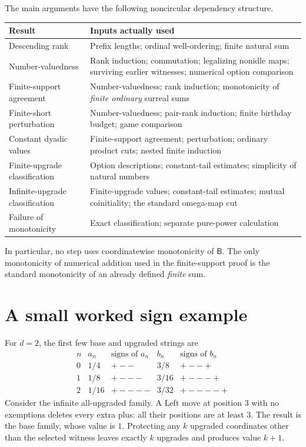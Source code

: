 \documentclass[11pt,letterpaper]{article}
\theoremstyle{definition}
\theoremstyle{remark}
\newcommand{\BB}{\mathsf B}
\begin{document}
The main arguments have the following noncircular dependency structure.
\begin{center}
\renewcommand{\arraystretch}{1.14}
\begin{tabular}{p{}p{}}
\toprule
Result & Inputs actually used\\
\midrule
Descending rank & Prefix lengths; ordinal well-ordering; finite natural sum\\
Number-valuedness & Rank induction; commutation; legalizing nonidle maps;
 surviving earlier witnesses; numerical option comparison\\
Finite-support agreement & Number-valuedness; rank induction; monotonicity of
 \emph{finite ordinary} surreal sums\\
Finite-short perturbation & Number-valuedness; pair-rank induction; finite
 birthday budget; game comparison\\
Constant dyadic values & Finite-support agreement; perturbation; ordinary
 product cuts; nested finite induction\\
Finite-upgrade classification & Option descriptions; constant-tail estimates;
 simplicity of natural numbers\\
Infinite-upgrade classification & Finite-upgrade values; constant-tail estimates;
 mutual coinitiality; the standard omega-map cut\\
Failure of monotonicity & Exact classification; separate pure-power calculation\\
\bottomrule
\end{tabular}
\end{center}
In particular, no step uses coordinatewise monotonicity of $\BB$. The only
monotonicity of numerical addition used in the finite-support proof is the
standard monotonicity of an already defined \emph{finite} sum.

\section{A small worked sign example}

For $d=2$, the first few base and upgraded strings are
\[
\begin{array}{c|c|c|c|c}
 n&a_n&\text{signs of }a_n&b_n&\text{signs of }b_n\\\hline
 0&1/4&\mathtt{+--}&3/8&\mathtt{+--+}\\
 1&1/8&\mathtt{+---}&3/16&\mathtt{+---+}\\
 2&1/16&\mathtt{+----}&3/32&\mathtt{+----+}
\end{array}
\]
Consider the infinite all-upgraded family. A Left move at position $3$ with no
exemptions deletes every extra plus: all their positions are at least $3$.
The result is the base family, whose value is $1$. Protecting any $k$ upgraded
coordinates other than the selected witness leaves exactly $k$ upgrades and
produces value $k+1$.
\end{document}
